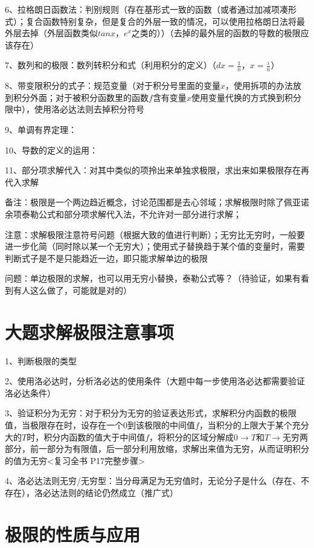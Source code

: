 6、拉格朗日函数法：判别规则（存在基形式一致的函数（或者通过加减项凑形式）；复合函数特别复杂，但是复合的外层一致的情况，可以使用拉格朗日法将最外层去掉（外层函数类似$tanx$，$e^x$之类的））（去掉的最外层的函数的导数的极限应该存在）

7、数列和的极限：数列转积分和式（利用积分的定义）（$dx=\frac{1}{n}$，$x=\frac{i}{n}$）

8、带变限积分的式子：规范变量（对于积分号里面的变量$x$，使用拆项的办法放到积分外面；对于被积分函数里的函数$f$含有变量$x$使用变量代换的方式换到积分限中），使用洛必达法则去掉积分符号

9、单调有界定理：

10、导数的定义的运用：

11、部分项求解代入：对其中类似的项拎出来单独求极限，求出来如果极限存在再代入求解

备注：极限是一个两边趋近概念，讨论范围都是去心邻域；求解极限时除了佩亚诺余项泰勒公式和部分项求解代入法，不允许对一部分进行求解；

注意：求解极限注意符号问题（根据大致的值进行判断）；无穷比无穷时，一般要进一步化简（同时除以某一个无穷大）；使用式子替换趋于某个值的变量时，需要判断式子是不是只能趋近一边，即只能求解单边的极限

问题：单边极限的求解，也可以用无穷小替换，泰勒公式等？（待验证，如果有看到有人这么做了，可能就是对的）

\section{大题求解极限注意事项}

1、判断极限的类型

2、使用洛必达时，分析洛必达的使用条件（大题中每一步使用洛必达都需要验证洛必达条件）

3、验证积分为无穷：对于积分为无穷的验证表达形式，求解积分内函数的极限值，当极限存在时，设存在一个$0$到该极限的中间值$f$，当积分的上限大于某个充分大的$T$时，积分内函数的值大于中间值$f$，将积分的区域分解成$0→T$和$T→无穷$两部分，前一部分为有限值，后一部分利用放缩，求解出来值为无穷，从而证明积分的值为无穷<复习全书 P17完整步骤>

4、洛必达法则无穷/无穷型：当分母满足为无穷值时，无论分子是什么（存在、不存在），洛必达法则的结论仍然成立（推广式）

\section{极限的性质与应用}

